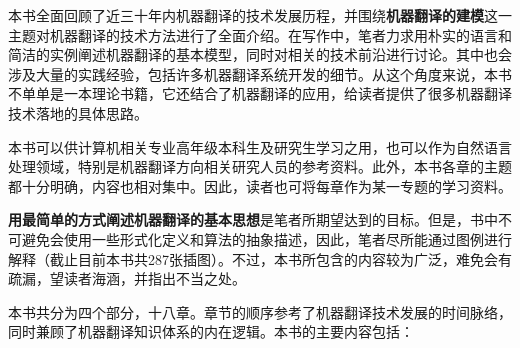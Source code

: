 \begin{spacing}{1.18}

本书全面回顾了近三十年内机器翻译的技术发展历程，并围绕{\sffamily\bfseries 机器翻译的建模}这一主题对机器翻译的技术方法进行了全面介绍。在写作中，笔者力求用朴实的语言和简洁的实例阐述机器翻译的基本模型，同时对相关的技术前沿进行讨论。其中也会涉及大量的实践经验，包括许多机器翻译系统开发的细节。从这个角度来说，本书不单单是一本理论书籍，它还结合了机器翻译的应用，给读者提供了很多机器翻译技术落地的具体思路。

本书可以供计算机相关专业高年级本科生及研究生学习之用，也可以作为自然语言处理领域，特别是机器翻译方向相关研究人员的参考资料。此外，本书各章的主题都十分明确，内容也相对集中。因此，读者也可将每章作为某一专题的学习资料。

{\sffamily\bfseries 用最简单的方式阐述机器翻译的基本思想}是笔者所期望达到的目标。但是，书中不可避免会使用一些形式化定义和算法的抽象描述，因此，笔者尽所能通过图例进行解释（截止目前本书共287张插图）。不过，本书所包含的内容较为广泛，难免会有疏漏，望读者海涵，并指出不当之处。

本书共分为四个部分，十八章。章节的顺序参考了机器翻译技术发展的时间脉络，同时兼顾了机器翻译知识体系的内在逻辑。本书的主要内容包括：


\end{spacing}
